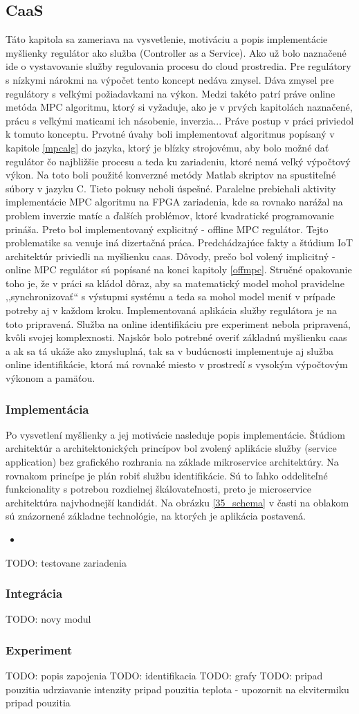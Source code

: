 \subsection{CaaS} \label{caas}
Táto kapitola sa zameriava na vysvetlenie, motiváciu a popis implementácie myšlienky regulátor ako služba (Controller as a Service). Ako už bolo naznačené ide o vystavovanie služby regulovania procesu do cloud prostredia. Pre regulátory s nízkymi nárokmi na výpočet tento koncept nedáva zmysel. Dáva zmysel pre regulátory s veľkými požiadavkami na výkon. Medzi takéto patrí práve online metóda MPC algoritmu, ktorý si vyžaduje, ako je v prvých kapitolách naznačené, prácu s veľkými maticami ich násobenie, inverzia...  Práve postup v práci priviedol k tomuto konceptu. Prvotné úvahy boli implementovať algoritmus popísaný v kapitole \ref{mpcalg} do jazyka, ktorý je blízky strojovému, aby bolo možné dať regulátor čo najbližšie procesu a teda ku zariadeniu, ktoré nemá veľký výpočtový výkon. Na toto boli použité konverzné metódy Matlab skriptov na spustiteľné súbory v jazyku C. Tieto pokusy neboli úspešné. Paralelne prebiehali aktivity implementácie MPC algoritmu na FPGA zariadenia, kde sa rovnako narážal na problem inverzie matíc a ďalších problémov, ktoré kvadratické programovanie prináša. Preto bol implementovaný explicitný - offline MPC regulátor. Tejto problematike sa venuje iná dizertačná práca. Predchádzajúce fakty a štúdium IoT architektúr priviedli na myšlienku caas. Dôvody, prečo bol volený implicitný - online MPC regulátor sú popísané na konci kapitoly \ref{offmpc}. Stručné opakovanie toho je, že v práci sa kládol dôraz, aby sa matematický model mohol pravidelne ,,synchronizovať`` s výstupmi systému a teda sa mohol model meniť v prípade potreby aj v každom kroku. Implementovaná aplikácia služby regulátora je na toto pripravená. Služba na online identifikáciu pre experiment nebola pripravená, kvôli svojej komplexnosti. Najskôr bolo potrebné overiť základnú myšlienku caas a ak sa tá ukáže ako zmysluplná, tak sa v budúcnosti implementuje aj služba online identifikácie, ktorá má rovnaké miesto v prostredí s vysokým výpočtovým výkonom a pamäťou.
\subsubsection{Implementácia}
Po vysvetlení myšlienky a jej motivácie nasleduje popis implementácie. Štúdiom architektúr a architektonických princípov bol zvolený aplikácie služby (service application) bez grafického rozhrania na základe mikroservice architektúry. Na rovnakom princípe je plán robiť službu identifikácie. Sú to ľahko oddeliteľné funkcionality s potrebou rozdielnej škálovateľnosti, preto je microservice architektúra najvhodnejší kandidát. Na obrázku \ref{35_schema} v časti na oblakom sú znázornené základne technológie, na ktorých je aplikácia postavená.
\begin{itemize}
  \item 
\end{itemize} 

TODO: testovane zariadenia 
\subsubsection{Integrácia}
TODO: novy modul
\subsubsection{Experiment}
TODO: popis zapojenia
TODO: identifikacia
TODO: grafy
TODO: 
pripad pouzitia udrziavanie intenzity
pripad pouzitia teplota - upozornit na ekvitermiku
pripad pouzitia

